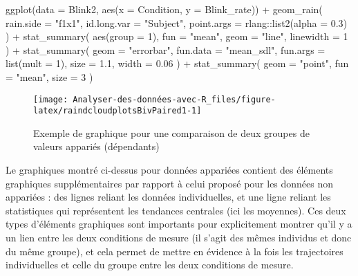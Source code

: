 \documentclass[
]{book}
\newenvironment{Shaded}{\begin{snugshade}}{\end{snugshade}}
\newcommand{\AttributeTok}[1]{\textcolor[rgb]{0.77,0.63,0.00}{#1}}
\newcommand{\DecValTok}[1]{\textcolor[rgb]{0.00,0.00,0.81}{#1}}
\newcommand{\FloatTok}[1]{\textcolor[rgb]{0.00,0.00,0.81}{#1}}
\newcommand{\FunctionTok}[1]{\textcolor[rgb]{0.00,0.00,0.00}{#1}}
\newcommand{\NormalTok}[1]{#1}
\newcommand{\SpecialCharTok}[1]{\textcolor[rgb]{0.00,0.00,0.00}{#1}}
\newcommand{\StringTok}[1]{\textcolor[rgb]{0.31,0.60,0.02}{#1}}
\begin{document}
\begin{Shaded}
\begin{Highlighting}[]
\FunctionTok{ggplot}\NormalTok{(}\AttributeTok{data =}\NormalTok{ Blink2, }\FunctionTok{aes}\NormalTok{(}\AttributeTok{x =}\NormalTok{ Condition, }\AttributeTok{y =}\NormalTok{ Blink\_rate)) }\SpecialCharTok{+}
  \FunctionTok{geom\_rain}\NormalTok{(}
    \AttributeTok{rain.side =} \StringTok{"f1x1"}\NormalTok{,}
    \AttributeTok{id.long.var =} \StringTok{"Subject"}\NormalTok{,}
    \AttributeTok{point.args =}\NormalTok{ rlang}\SpecialCharTok{::}\FunctionTok{list2}\NormalTok{(}\AttributeTok{alpha =} \FloatTok{0.3}\NormalTok{)}
\NormalTok{  ) }\SpecialCharTok{+}
  \FunctionTok{stat\_summary}\NormalTok{(}
    \FunctionTok{aes}\NormalTok{(}\AttributeTok{group =} \DecValTok{1}\NormalTok{),}
    \AttributeTok{fun =} \StringTok{"mean"}\NormalTok{,}
    \AttributeTok{geom =} \StringTok{"line"}\NormalTok{,}
    \AttributeTok{linewidth =} \DecValTok{1}
\NormalTok{  ) }\SpecialCharTok{+}
  \FunctionTok{stat\_summary}\NormalTok{(}
    \AttributeTok{geom =} \StringTok{"errorbar"}\NormalTok{,}
    \AttributeTok{fun.data =} \StringTok{"mean\_sdl"}\NormalTok{,}
    \AttributeTok{fun.args =} \FunctionTok{list}\NormalTok{(}\AttributeTok{mult =} \DecValTok{1}\NormalTok{),}
    \AttributeTok{size =} \FloatTok{1.1}\NormalTok{, }
    \AttributeTok{width =} \FloatTok{0.06}
\NormalTok{    ) }\SpecialCharTok{+} 
  \FunctionTok{stat\_summary}\NormalTok{(}
    \AttributeTok{geom =} \StringTok{"point"}\NormalTok{,}
    \AttributeTok{fun =} \StringTok{"mean"}\NormalTok{, }
    \AttributeTok{size =} \DecValTok{3}
\NormalTok{    )}
\end{Highlighting}
\end{Shaded}

\begin{figure}

{\centering \texttt{[image: Analyser-des-données-avec-R\_files/figure-latex/raindcloudplotsBivPaired1-1]} 

}

\caption{Exemple de graphique pour une comparaison de deux groupes de valeurs appariés (dépendants)}\label{fig:raindcloudplotsBivPaired1}
\end{figure}

Le graphiques montré ci-dessus pour données appariées contient des éléments graphiques supplémentaires par rapport à celui proposé pour les données non appariées : des lignes reliant les données individuelles, et une ligne reliant les statistiques qui représentent les tendances centrales (ici les moyennes). Ces deux types d'éléments graphiques sont importants pour explicitement montrer qu'il y a un lien entre les deux conditions de mesure (il s'agit des mêmes individus et donc du même groupe), et cela permet de mettre en évidence à la fois les trajectoires individuelles et celle du groupe entre les deux conditions de mesure.
\end{document}
